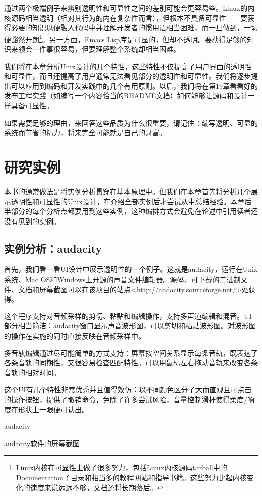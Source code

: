 \documentclass[12pt,oneside]{book}
\begin{document}
\begin{common-format}
通过两个极端例子来辨别透明性和可显性之间的差别可能会更容易些。Linux的内核源码相当透明（相对其行为的内在复杂性而言），但根本不具备可显性——要获得必要的知识以便融入代码中并理解开发者的惯用语相当困难，而一旦做到，一切便豁然开朗\footnote{Linux内核在可显性上做了很多努力，包括Linux内核源码tarball中的Documentation子目录和相当多的教程网站和指导书籍。这些努力比起内核变化的速度来说远远不够，文档还将长期落后。}。另一方面，Emacs Lisp库是可显的，但却不透明。要获得足够的知识来领会一件事很容易，但要理解整个系统却相当困难。

我们将在本章分析Unix设计的几个特性，这些特性不仅提高了用户界面的透明性和可显性，而且还提高了用户通常无法看见部分的透明性和可显性。我们将逐步提出可以应用到编码和开发实践中的几个有用原则。以后，我们将在第19章看看好的发布工程实践（如编写一个内容恰当的README文档）如何能够让源码和设计一样具备可显性。

如果需要足够的理由，来回答这些品质为什么很重要，请记住：编写透明、可显的系统而节省的精力，将来完全可能就是自己的财富。


\section{研究实例}
本书的通常做法是将实例分析贯穿在基本原理中。但我们在本章首先将分析几个展示透明性和可显性的Unix设计，在介绍全部实例后才尝试从中总结经验。本章后半部分的每个分析点都要用到这些实例，这种编排方式会避免在论述中引用读者还没有见到的实例。

\subsection{实例分析：audacity}
首先，我们看一看UI设计中展示透明性的一个例子。这就是audacity，运行在Unix系统、Mac OS和Windows上开源的声音文件编辑器。源码、可下载的二进制文件、文档和屏幕截图可以在该项目的站点<http://audacity.sourceforge.net/>处获得。

这个程序支持对音频采样的剪切、粘贴和编辑操作，支持多声道编辑和混音。UI部分相当简洁：audacity窗口显示声音波形图，可以剪切和粘贴波形图。对波形图的操作在实施的同时直接反映在音频采样中。

多音轨编辑通过尽可能简单的方式支持：屏幕按空间关系显示每条音轨，既表达了各条音轨的同期性，又很容易检查匹配特性。可以用鼠标左右拖动音轨来改变各条音轨的相对时间。

这个UI有几个特性非常优秀并且值得效仿：以不同颜色区分了大而直观且可点击的操作按钮，提供了撤销命令，免除了许多尝试风险，音量控制滑杆使得柔度/响度在形状上一眼便可认出。
\begin{linefig}{audacity}
\caption{audacity软件的屏幕截图}
\label{fig:audacity}
\end{linefig}


\end{common-format}
\end{document}
